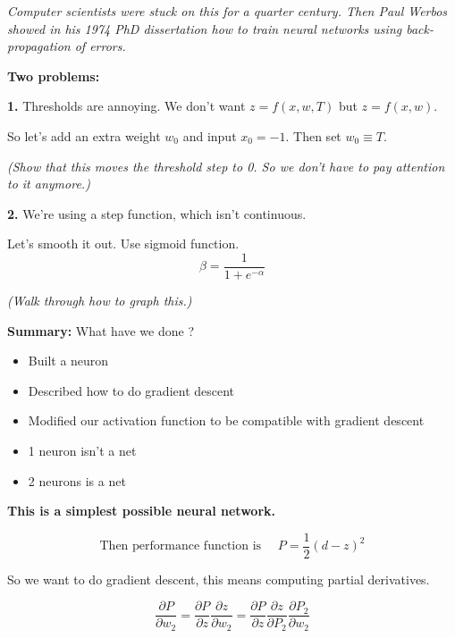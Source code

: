 \textit{Computer scientists were stuck on this for a quarter century.
Then Paul Werbos showed in his 1974 PhD dissertation how to train
neural networks using back-propagation of errors.}

\textbf{Two problems:}

\textbf{\large 1. } Thresholds are annoying.  We don't want $z = f(x, w, T)$
but $z=f(x, w)$.

So let's add an extra weight $w_0$ and input $x_0=-1$.  Then set $w_0\equiv T$.

\textit{(Show that this moves the threshold step to 0.  So we don't
  have to pay attention to it anymore.)}

\textbf{\large 2. } We're using a step function, which isn't continuous.

Let's smooth it out.  Use sigmoid function.
\begin{displaymath}
  \beta = \frac{1}{1+e^{-\alpha}}
\end{displaymath}

\textit{(Walk through how to graph this.)}

\textbf{Summary: } What have we done ?
\begin{itemize}
\item Built a neuron
\item Described how to do gradient descent
\item Modified our activation function to be compatible with gradient descent
\end{itemize}


\begin{itemize}
\item 1 neuron isn't a net
\item 2 neurons is a  net
\end{itemize}

\textbf{This is a simplest possible neural network.}



\begin{displaymath}
  \mbox{Then performance function is } \quad  P = \frac{1}{2} (d-z)^2
\end{displaymath}

So we want to do gradient descent, this means computing partial derivatives.

\begin{displaymath}
  \frac{\partial P}{\partial w_2}
  =
  \frac{\partial P}{\partial z}
  \frac{\partial z}{\partial w_2}
  =
  \frac{\partial P}{\partial z}
  \frac{\partial z}{\partial P_2}
  \frac{\partial P_2}{\partial w_2}
\end{displaymath}


